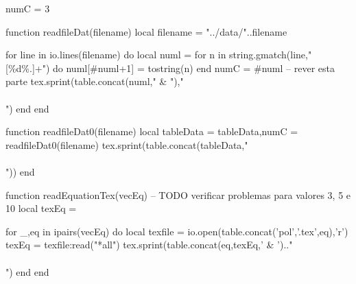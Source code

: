 

\begin{luacode}
  numC = 3

  function readfileDat(filename)
    local filename = "../data/"..filename

    for line in io.lines(filename) do
        local numl = {}
        for n in string.gmatch(line,"[\%d\%.]+") do
          numl[#numl+1] = tostring(n)
        end
        numC = #numl -- rever esta parte
        tex.sprint(table.concat(numl," & "),"\\\\")
    end
  end

  function readfileDat0(filename)
     local tableData = {}
     tableData,numC = readfileDat0(filename)
     tex.sprint(table.concat(tableData,"\\\\"))
  end

\end{luacode}

\newcommand{\luaTable}[5][\directlua{tex.print(numC)}]
{
  \begin{table}[H]
  \centering
  \label{#4}
  \caption{#3}
  \begin{tabular}{*{#1}{c}}
  \hline
  #5\\
  \hline
  \directlua{readfileDat('#2')}
  \hline
  \end{tabular}
  \end{table}
}



\begin{luacode}
  function readEquationTex(vecEq)
    -- TODO verificar problemas para valores 3, 5 e 10
    local texEq = {}

    for _,eq in ipairs(vecEq) do
      local texfile = io.open(table.concat({'pol','.tex'},eq),'r')
      texEq = texfile:read("*all")
      tex.sprint(table.concat({eq,texEq},' & ').." \\\\")
    end
  end
\end{luacode}

\newcommand{\polyTable}[3][tbPoly]
{
  \begin{table}[H]
    \label{#1}
    \centering
    \caption{#3}
    \begin{tabular}{c p{10cm}}
      \hline
      $i$ & $f_i(x)$\\
      \hline
      \directlua{readEquationTex({#2})}
      \hline
    \end{tabular}
  \end{table}
}

